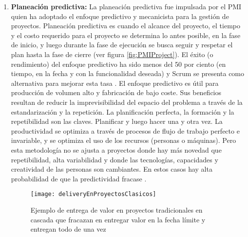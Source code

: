 \begin{enumerate}

\item \textbf{Planeación predictiva:} La planeación predictiva fue impulsada por el PMI quien ha adoptado el enfoque predictivo y mecanicista para la gestión de proyectos. Planeación predictiva es cuando el alcance del proyecto, el tiempo y el costo requerido para el proyecto se determina lo antes posible, en la fase de inicio, y luego durante la fase de ejecución se busca seguir y respetar el plan hasta la fase de cierre (ver figura \ref{fig:PMIProject}). El éxito (o rendimiento) del enfoque predictivo ha sido menos del 50 por ciento (en tiempo, en la fecha y con la funcionalidad deseada) y Scrum se presenta como alternativa para mejorar esta tasa \cite{Ken-Schwaber-2011}. El enfoque predictivo es útil para producción de volumen alto y fabricación de bajo coste. Sus beneficios resultan de reducir la imprevisibilidad del espacio del problema a través de la estandarización y la repetición. La planificación perfecta, la formación y la repetibilidad son las claves. Planificar y luego hacer una y otra vez. La productividad se optimiza a través de procesos de flujo de trabajo perfecto e invariable, y se optimiza el uso de los recursos (personas o máquinas). Pero esta metodología no se ajusta a proyectos donde hay más novedad que repetibilidad, alta variabilidad y donde las tecnologías, capacidades y creatividad de las personas son cambiantes. En estos casos hay alta probabilidad de que la predictividad fracase \cite{Ken-Schwaber-2011}.

\begin{figure}[h]
  \centering
  \texttt{[image: deliveryEnProyectosClasicos]}
  \caption{Ejemplo de entrega de valor en proyectos tradicionales en cascada que fracazan en entregar valor en la fecha límite y entregan todo de una vez}
  \centering
  \label{fig:deliveryEnProyectosClasicos} %
\end{figure}



\end{enumerate}
